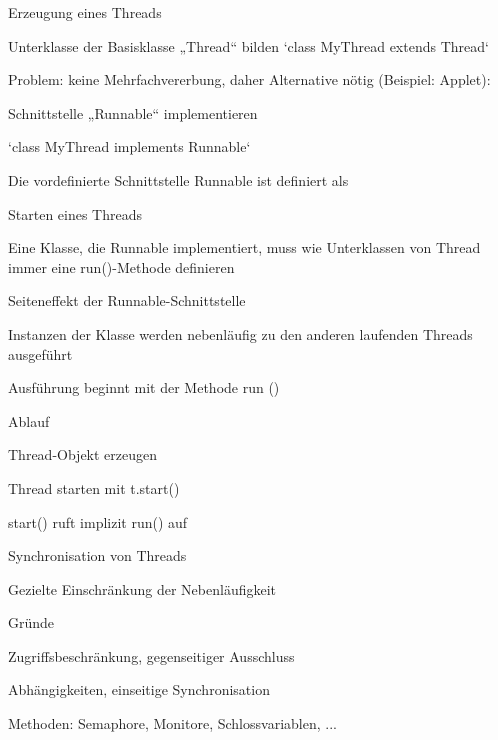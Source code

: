\documentclass[a4paper]{article}
\begin{document}
\begin{multicols}{3}
  Erzeugung eines Threads
  \begin{itemize*}
    \item Unterklasse der Basisklasse „Thread“ bilden `class MyThread extends Thread`
    \item Problem: keine Mehrfachvererbung, daher Alternative nötig (Beispiel: Applet):
    \begin{itemize*}
      \item Schnittstelle „Runnable“ implementieren
      \item `class MyThread implements Runnable`
    \end{itemize*}
    \item Die vordefinierte Schnittstelle Runnable ist definiert als
  \end{itemize*}

  Starten eines Threads
  \begin{itemize*}
    \item Eine Klasse, die Runnable implementiert, muss wie Unterklassen von Thread immer eine run()-Methode definieren
    \item Seiteneffekt der Runnable-Schnittstelle
    \begin{itemize*}
      \item Instanzen der Klasse werden nebenläufig zu den anderen laufenden Threads ausgeführt
      \item Ausführung beginnt mit der Methode run ()
    \end{itemize*}
    \item Ablauf
    \begin{itemize*}
      \item Thread-Objekt erzeugen
      \item Thread starten mit t.start()
      \item start() ruft implizit run() auf
    \end{itemize*}
  \end{itemize*}

  Synchronisation von Threads
  \begin{itemize*}
    \item Gezielte Einschränkung der Nebenläufigkeit
    \item Gründe
    \begin{itemize*}
      \item Zugriffsbeschränkung, gegenseitiger Ausschluss
      \item Abhängigkeiten, einseitige Synchronisation
    \end{itemize*}
    \item Methoden: Semaphore, Monitore, Schlossvariablen, ...
  \end{itemize*}


\end{multicols}
\end{document}
